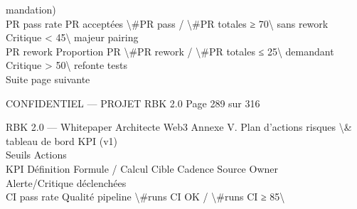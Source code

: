 mandation)\\
PR pass rate   PR acceptées       \textbackslash{}#PR pass / \textbackslash{}#PR totales       ≥ 70\textbackslash{}%
sans rework                                                                            Critique \textless{} 45\textbackslash{}%
majeur                                                                                                       pairing\\
PR rework      Proportion PR      \textbackslash{}#PR rework / \textbackslash{}#PR totales ≤ 25\textbackslash{}%
demandant                                                                              Critique \textgreater{} 50\textbackslash{}%
refonte                                                                                                      tests\\
Suite page suivante\\
\vspace{0.5em}
\vspace{0.5em}
\vspace{0.5em}
\vspace{0.5em}
\begin{confidential}CONFIDENTIEL — PROJET RBK 2.0                                                 Page 289 sur 316\end{confidential}
RBK 2.0 — Whitepaper Architecte Web3                                                                        Annexe V. Plan d’actions risques \textbackslash{}& tableau de bord KPI (v1)\\
\vspace{0.5em}
\vspace{0.5em}
Seuils                    Actions\\
KPI            Définition         Formule / Calcul           Cible      Cadence    Source     Owner\\
Alerte/Critique           déclenchées\\
CI pass rate   Qualité pipeline   \textbackslash{}#runs CI OK / \textbackslash{}#runs CI     ≥ 85\textbackslash{}%
